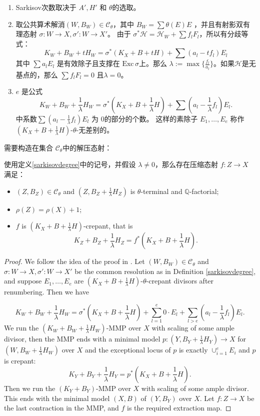 \begin{remark}
  \begin{enumerate}
    \item  Sarkisov次数取决于  $A', H'$ 和  $\theta$的选取。
    \item   取公共算术解消$ (W,B_W)\in \mathcal{C}_\theta $，其中 $ B_W=\sum \theta(E)E $ ，并且有射影双有理态射 $ \sigma:W\to X , \sigma':W\to X' $。 由于 $\sigma^*\mathcal{H}=\mathcal{H}_W+\sum f_{l}F_{l}$，所以有分歧等式：
          \[ K_W+B_W+tH_W=\sigma^*(K_X+B+tH)+\sum(a_l-tf_l)E_l \]
          其中 $ \sum a_lE_l $ 是有效除子且支撑在 $ \mathrm{Exc}\,\sigma $上。那么 $\lambda:=\max\{ \frac{f_l}{a_l}\}$。如果$ \mathcal{H} $是无基点的，那么 $ \sum f_lF_l=0 $ 且$\lambda=0  $。
    \item   $ e $ 是公式
          \[ K_W+B_W+\frac{1}{\lambda} H_W=\sigma^*(K_X+B+\frac{1}{\lambda} H)+\sum(a_l-\frac{1}{\lambda} f_l)E_l .\]
      中系数$\sum(a_l-\frac{1}{\lambda}f_l)E_l$ 为 $ 0 $的部分的个数。
          这样的素除子 $E_{1},\ldots, E_{e}$ 称作 $(K_{X}+B+\frac{1}{\lambda}H)$-$\theta$-无差别的。
  \end{enumerate}
\end{remark}
需要构造在集合 $\mathcal{C}_{\theta}$中的解压态射：
\begin{lemma}\label{thetaextraction}
  使用定义\ref{sarkisovdegree}中的记号，并假设 $\lambda \neq 0$，那么存在压缩态射  $f: Z\to X$ 满足：
  \begin{itemize}
    \item $(Z,B_{Z})\in \mathcal{C}_{\theta}$ and $(Z,B_{Z}+\frac{1}{\lambda}H_{Z})$ is $\theta$-terminal and $\mathbb{Q}$-factorial;
    \item  $\rho(Z)=\rho(X)+1$;
    \item $f$ is $(K_{X}+B+\frac{1}{\lambda}H)$-crepant, that is
          \[
            K_{Z}+B_{Z}+\frac{1}{\lambda}H_{Z}=f^*(K_{X}+B+\frac{1}{\lambda}H)
            .\]
  \end{itemize}
\end{lemma}
\begin{proof}
  We follow the idea of the proof in \cite[Proposition 1.6]{brunoLogSarkisovProgram1995}.  Let $(W,B_{W})\in \mathcal{C}_{\theta}$ and $\sigma:W\to X,\sigma':W \to X'$ be the common resolution as in Definition \ref{sarkisovdegree}, and suppose  $E_{1},\ldots ,E_{e}$ are   $(K_{X}+B+\frac{1}{\lambda}H)$-$\theta$-crepant divisors after renumbering. Then we have

  \[ K_W+B_W+\frac{1}{\lambda} H_W=\sigma^*(K_X+B+\frac{1}{\lambda} H)+\sum_{l=1}^{e} 0\cdot E_{l}+\sum_{l>e}(a_l-\frac{1}{\lambda} f_l)E_l .\]
  We run the $(K_{W}+B_{W}+\frac{1}{\lambda}H_{W})$-MMP over $X$ with scaling of some ample divisor, then the MMP ends with a minimal model $p:(Y, B_{Y}+\frac{1}{\lambda}H_{Y})\to X$  for $(W, B_{W}+\frac{1}{\lambda}H_{W})$ over $X$ and the exceptional locus of $p$ is exactly $\cup_{i=1}^{e}E_{i}$ and $p$ is crepant:
  \[
    K_{Y}+B_{Y}+\frac{1}{\lambda}H_{Y}=p^*(K_{X}+B+\frac{1}{\lambda}H)
    .\]
  Then we run the $(K_{Y}+B_{Y})$-MMP over $X$ with scaling of some ample divisor. This ends with the minimal model  $(X,B)$ of $(Y,B_{Y})$ over $X$. Let $f: Z\to X$ be the last contraction in the MMP, and $f$ is the required extraction map.
\end{proof}
